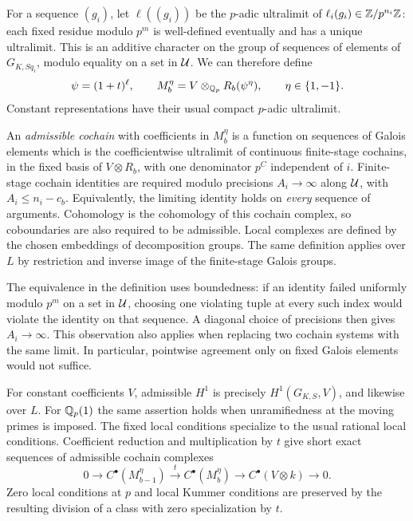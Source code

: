 For a sequence $(g_i)$, let $\ell((g_i))$ be the $p$-adic ultralimit
of $\ell_i(g_i)\in\mathbb Z/p^{n_i}\mathbb Z$: each fixed residue modulo $p^m$ is
well-defined eventually and has a unique ultralimit.  This is an
additive character on the group of sequences of elements of
$G_{K,Sq_i}$, modulo equality on a set in $\mathcal U$.  We can therefore
define
\[
 \psi=(1+t)^\ell,\qquad
 M_b^{\eta}=V\otimes_{\mathbb Q_p}R_b(\psi^{\eta}),
 \qquad \eta\in\{1,-1\}.
\]
Constant representations have their usual compact $p$-adic ultralimit.

\begin{definition}\label{def:admissible}
An \emph{admissible cochain} with coefficients in $M_b^{\eta}$ is a
function on sequences of Galois elements which is the coefficientwise
ultralimit of continuous finite-stage cochains, in the fixed basis
of $V\otimes R_b$, with one denominator $p^C$ independent of $i$.
Finite-stage cochain identities are required modulo precisions
$A_i\longrightarrow\infty$ along $\mathcal U$, with
$A_i\le n_i-c_b$.  Equivalently, the limiting identity holds on
\emph{every} sequence of arguments.  Cohomology is the cohomology
of this cochain complex, so coboundaries are also required to be
admissible.  Local complexes are defined by the chosen embeddings
of decomposition groups.  The same definition applies over $L$ by
restriction and inverse image of the finite-stage Galois groups.
\end{definition}

The equivalence in the definition uses boundedness: if an identity
failed uniformly modulo $p^m$ on a set in $\mathcal U$, choosing one
violating tuple at every such index would violate the identity on
that sequence.  A diagonal choice of precisions then gives
$A_i\to\infty$.  This observation also applies when replacing two
cochain systems with the same limit.  In particular, pointwise
agreement only on fixed Galois elements would not suffice.

\begin{lemma}\label{lem:admissible-specialization}
For constant coefficients $V$, admissible $H^1$ is precisely
$H^1(G_{K,S},V)$, and likewise over $L$.  For $\mathbb Q_p(1)$ the same
assertion holds when unramifiedness at the moving primes is imposed.
The fixed local conditions specialize to the usual rational local
conditions.  Coefficient reduction and multiplication by $t$ give
short exact sequences of admissible cochain complexes
\begin{equation}\label{eq:coefficient-sequence}
 0\longrightarrow C^\bullet(M_{b-1}^{\eta})
 \xrightarrow{\ t\ } C^\bullet(M_b^{\eta})
 \longrightarrow C^\bullet(V\otimes k)\longrightarrow0.
\end{equation}
Zero local conditions at $p$ and local Kummer conditions are
preserved by the resulting division of a class with zero
specialization by $t$.
\end{lemma}

